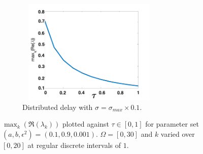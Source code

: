 \begin{figure}[H]
\begin{subfigure}[b]{0.45\textwidth}
        \includegraphics[width=7cm,height=5cm]{p2sigmax10.png}
        \caption{Distributed delay with $\sigma=\sigma_{max}\times0.1$.}
        \label{}
    \end{subfigure}
    \caption{$\max_k(\Re(\lambda_k))$ plotted against $\tau\in[0,1]$ for parameter set $(a,b,\epsilon^2)=(0.1,0.9,0.001)$. $\Omega=[0,30]$ and $k$ varied over $[0,20]$ at regular discrete intervals of $1$.}
    \label{fig:p2}
\end{figure}
